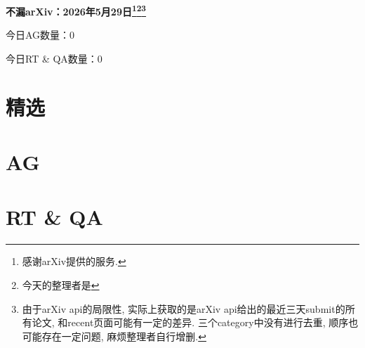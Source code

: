 \documentclass[9pt, a4paper]{article}
\theoremstyle{plain}
\theoremstyle{definition}
\theoremstyle{remark}
\newcommand{\AGnumber}{0}
\newcommand{\RTQAnumber}{0}
\newcommand{\NewestDate}{2026年5月29日}
\newcommand{\todayarXiver}{} %
\begin{document}
\begin{center}
    \Huge\textbf{不漏arXiv：\NewestDate\footnote{感谢arXiv提供的服务.}\footnote{今天的整理者是\todayarXiver}\footnote{由于arXiv api的局限性, 实际上获取的是arXiv api给出的最近三天submit的所有论文, 和recent页面可能有一定的差异. 三个category中没有进行去重, 顺序也可能存在一定问题, 麻烦整理者自行增删.}} \\
\end{center}

\setcounter{section}{-1}

\begin{center}
    今日AG数量：\AGnumber
    
    今日RT \& QA数量：\RTQAnumber
    
\end{center}


\section{精选}


\section{AG}

\section{RT \& QA}
\end{document}
